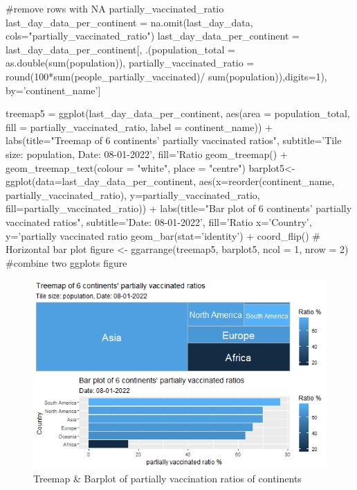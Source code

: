 \begin{Rcode}{\scriptsize}
#remove rows with NA partially\_vaccinated\_ratio
last_day_data_per_continent = na.omit(last_day_data, 
                                      cols="partially_vaccinated_ratio") 
last_day_data_per_continent = last_day_data_per_continent[, 
    .(population_total = as.double(sum(population)), 
    partially_vaccinated_ratio = round(100*sum(people_partially_vaccinated)/
                                         sum(population)),digits=1),
    by='continent_name']

treemap5 = ggplot(last_day_data_per_continent, aes(area = population_total, 
                fill = partially_vaccinated_ratio, label = continent_name)) +
  labs(title="Treemap of 6 continents' partially vaccinated ratios",
       subtitle='Tile size: population, Date: 08-01-2022', fill='Ratio %
  geom_treemap() +
  geom_treemap_text(colour = "white",
                    place = "centre")
barplot5<-ggplot(data=last_day_data_per_continent, 
                 aes(x=reorder(continent_name, partially_vaccinated_ratio), 
                 y=partially_vaccinated_ratio, fill=partially_vaccinated_ratio)) +
  labs(title="Bar plot of 6 continents' partially vaccinated ratios",
       subtitle='Date: 08-01-2022', fill='Ratio %
       x='Country', y='partially vaccinated ratio %
  geom_bar(stat='identity') +
  coord_flip() # Horizontal bar plot
figure <- ggarrange(treemap5, barplot5, ncol = 1, nrow = 2) #combine two ggplots
figure
\end{Rcode}

\begin{figure}[h]
    \centering
    \includegraphics[width=12cm]{figures/Treemap_Barplot_Continents_ratios.png}
    \caption{Treemap \& Barplot of partially vaccination ratios of continents}
    \label{fig:continents_ratios}
\end{figure}
\FloatBarrier %

